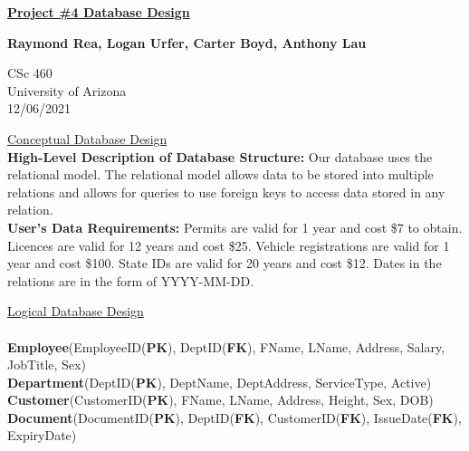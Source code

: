 \documentclass[12pt]{article}   %
\begin{document}
\begin{titlepage}
   \begin{center}
       \vspace*{1cm}

       \underline{\textbf{Project \#4 Database Design}}

       \vspace{1.5cm}

       \textbf{Raymond Rea, Logan Urfer, Carter Boyd, Anthony Lau}

       \vfill
            
       CSc 460\\
       University of Arizona\\
       12/06/2021
            
   \end{center}
\end{titlepage}
\newpage


\underline{Conceptual Database Design}\\
\textbf{High-Level Description of Database Structure:} Our database uses the relational model. The relational model allows data to be stored into multiple relations and allows for queries to use foreign keys to access data stored in any relation.\\

\textbf{User's Data Requirements:} Permits are valid for 1 year and cost \$7 to obtain. Licences are valid for 12 years and cost \$25. Vehicle registrations are valid for 1 year and cost \$100. State IDs are valid for 20 years and cost \$12. Dates in the relations are in the form of YYYY-MM-DD.

\underline{Logical Database Design}\\
\\
\textbf{Employee}(EmployeeID(\textbf{PK}), DeptID(\textbf{FK}), FName, LName, Address, Salary, JobTitle, Sex)\\

\textbf{Department}(DeptID(\textbf{PK}), DeptName, DeptAddress, ServiceType, Active)\\

\textbf{Customer}(CustomerID(\textbf{PK}), FName, LName, Address, Height, Sex, DOB)\\

\textbf{Document}(DocumentID(\textbf{PK}), DeptID(\textbf{FK}), CustomerID(\textbf{FK}), IssueDate(\textbf{FK}), ExpiryDate)\\
\end{document}
